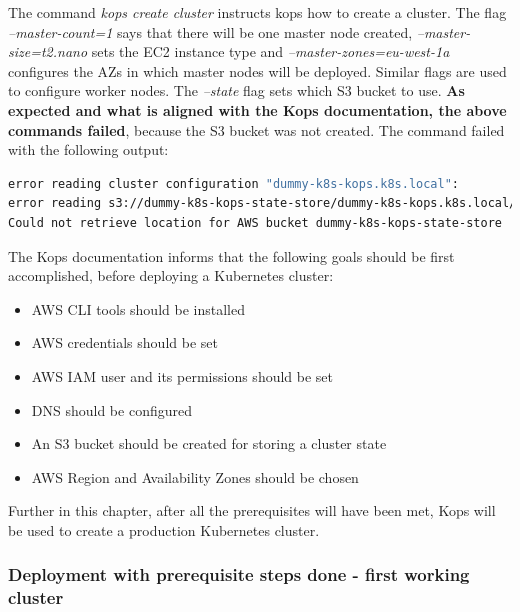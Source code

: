 The command \textit{kops create cluster} instructs kops how to create a cluster. The flag \textit{--master-count=1} says that there will be one master node created, \textit{--master-size=t2.nano} sets the EC2 instance type and \textit{--master-zones=eu-west-1a} configures the AZs in which master nodes will be deployed. Similar flags are used to configure worker nodes. The \textit{--state} flag sets which S3 bucket to use.  \textbf{As expected and what is aligned with the Kops documentation\cite{online-kops-aws}, the above commands failed}, because the S3 bucket was not created. The command failed with the following output:
\begin{lstlisting}[basicstyle=\tiny,caption={Output of the commands used to create a cluster with Kops, without prerequisite steps performed},captionpos=b,language=Bash,xleftmargin=1cm]
error reading cluster configuration "dummy-k8s-kops.k8s.local":
error reading s3://dummy-k8s-kops-state-store/dummy-k8s-kops.k8s.local/config:
Could not retrieve location for AWS bucket dummy-k8s-kops-state-store
\end{lstlisting}

The Kops documentation\cite{online-kops-aws} informs that the following goals should be first accomplished, before deploying a Kubernetes cluster:
\begin{itemize}
\item AWS CLI tools should be installed
\item AWS credentials should be set
\item AWS IAM user and its permissions should be set
\item DNS should be configured
\item An S3 bucket should be created for storing a cluster state
\item AWS Region and Availability Zones should be chosen
\end{itemize}

Further in this chapter, after all the prerequisites will have been met, Kops will be used to create a production Kubernetes cluster.

\subsubsection{Deployment with prerequisite steps done - first working cluster}

